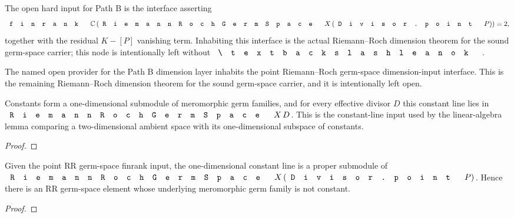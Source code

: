 \begin{definition}
\label{def:rr-germ-space-dimension-input}
The open hard input for Path B is the interface asserting
\[
  \code{finrank}\,\C\,
    (\code{RiemannRochGermSpace}\,X\,(\code{Divisor.point}\,P)) = 2,
\]
together with the residual \(K-[P]\) vanishing term. Inhabiting this interface
is the actual Riemann--Roch dimension theorem for the sound germ-space carrier;
this node is intentionally left without \(\code{\textbackslash leanok}\).
\end{definition}

\begin{lemma}
\label{lem:rr-germ-space-dimension-input-provider}
The named open provider for the Path B dimension layer inhabits the point
Riemann--Roch germ-space dimension-input interface. This is the remaining
Riemann--Roch dimension theorem for the sound germ-space carrier, and it is
intentionally left open.
\end{lemma}

\begin{lemma}
\label{lem:rr-germ-space-constant-line}
Constants form a one-dimensional submodule of meromorphic germ families, and
for every effective divisor \(D\) this constant line lies in
\(\code{RiemannRochGermSpace}\,X\,D\). This is the constant-line input used by
the linear-algebra lemma comparing a two-dimensional ambient space with its
one-dimensional subspace of constants.
\leanok
\end{lemma}
\begin{proof}
\leanok
\end{proof}

\begin{lemma}
\label{lem:rr-germ-space-outside-constants}
Given the point RR germ-space finrank input, the one-dimensional constant line
is a proper submodule of
\(\code{RiemannRochGermSpace}\,X\,(\code{Divisor.point}\,P)\). Hence there is
an RR germ-space element whose underlying meromorphic germ family is not
constant.
\leanok
\end{lemma}
\begin{proof}
\leanok
\end{proof}

